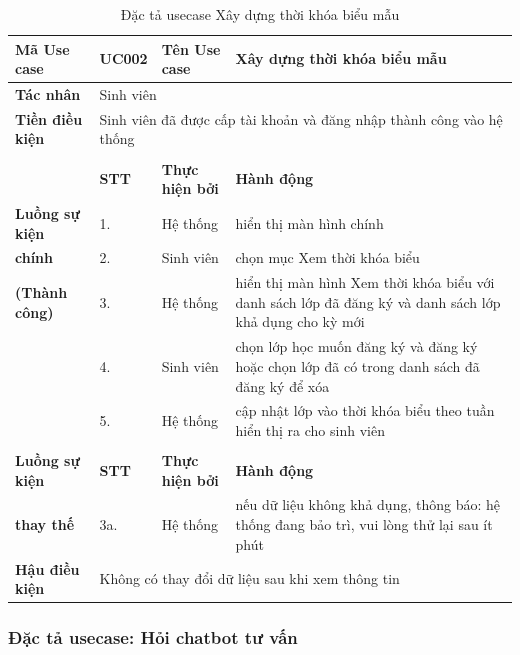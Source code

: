 \documentclass[12pt,a4paper]{report}
\begin{document}
\begin{table}[H]
\renewcommand{\arraystretch}{1.4}
\centering
\begin{tabularx}{\textwidth}{|>{\columncolor[HTML]{C6E0B4}}l|l|l|X|}
\hline
\textbf{Mã Use case} & UC002 & \textbf{Tên Use case} & Xây dựng thời khóa biểu mẫu \\ \hline
\textbf{Tác nhân} & \multicolumn{3}{l|}{Sinh viên} \\ \hline
\textbf{Tiền điều kiện} & \multicolumn{3}{p{13cm}|}{Sinh viên đã được cấp tài khoản và đăng nhập thành công vào hệ thống} \\ \hline
 & \multicolumn{3}{l|}{} \\
 & \cellcolor[HTML]{F8CBAD}\textbf{STT} & \cellcolor[HTML]{F8CBAD}\textbf{Thực hiện bởi} & \cellcolor[HTML]{F8CBAD}\textbf{Hành động} \\ \cline{2-4} 
\textbf{Luồng sự kiện} & 1. & Hệ thống & hiển thị màn hình chính \\ \cline{2-4} 
\textbf{chính} & 2. & Sinh viên & chọn mục Xem thời khóa biểu \\ \cline{2-4} 
\textbf{(Thành công)} & 3. & Hệ thống & hiển thị màn hình Xem thời khóa biểu với danh sách lớp đã đăng ký và danh sách lớp khả dụng cho kỳ mới \\ \cline{2-4} 
 & 4. & Sinh viên & chọn lớp học muốn đăng ký và đăng ký hoặc chọn lớp đã có trong danh sách đã đăng ký để xóa \\ \cline{2-4} 
\multirow{-7}{*}{\textbf{}} & 5. & Hệ thống & cập nhật lớp vào thời khóa biểu theo tuần hiển thị ra cho sinh viên \\ \hline
 & \multicolumn{3}{l|}{} \\
\textbf{Luồng sự kiện} & \cellcolor[HTML]{F8CBAD}\textbf{STT} & \cellcolor[HTML]{F8CBAD}\textbf{Thực hiện bởi} & \cellcolor[HTML]{F8CBAD}\textbf{Hành động} \\ \cline{2-4} 
\textbf{thay thế} & 3a. & Hệ thống & nếu dữ liệu không khả dụng, thông báo: hệ thống đang bảo trì, vui lòng thử lại sau ít phút \\ \hline
\textbf{Hậu điều kiện} & \multicolumn{3}{l|}{Không có thay đổi dữ liệu sau khi xem thông tin} \\ \hline
\end{tabularx}
\caption{Đặc tả usecase Xây dựng thời khóa biểu mẫu}
\end{table}

\subsubsection{Đặc tả usecase: Hỏi chatbot tư vấn}
\end{document}
